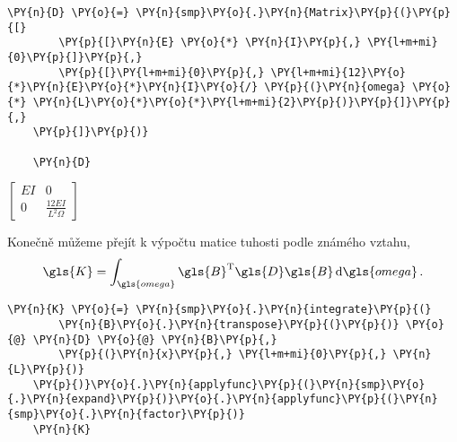 \begin{tcolorbox}[breakable, size=fbox, boxrule=1pt, pad at break*=1mm,colback=cellbackground, colframe=cellborder]
    \begin{Verbatim}[commandchars=\\\{\}]
    \PY{n}{D} \PY{o}{=} \PY{n}{smp}\PY{o}{.}\PY{n}{Matrix}\PY{p}{(}\PY{p}{[}
        \PY{p}{[}\PY{n}{E} \PY{o}{*} \PY{n}{I}\PY{p}{,} \PY{l+m+mi}{0}\PY{p}{]}\PY{p}{,}
        \PY{p}{[}\PY{l+m+mi}{0}\PY{p}{,} \PY{l+m+mi}{12}\PY{o}{*}\PY{n}{E}\PY{o}{*}\PY{n}{I}\PY{o}{/} \PY{p}{(}\PY{n}{omega} \PY{o}{*} \PY{n}{L}\PY{o}{*}\PY{o}{*}\PY{l+m+mi}{2}\PY{p}{)}\PY{p}{]}\PY{p}{,}
    \PY{p}{]}\PY{p}{)}
    
    \PY{n}{D}
    \end{Verbatim}
\end{tcolorbox}
     
                
    
    $\displaystyle \left[\begin{matrix}E I & 0\\0 & \frac{12 E I}{L^{2} \Omega}\end{matrix}\right]$

\vspace{0.3cm}
Konečně můžeme přejít k výpočtu matice tuhosti podle známého vztahu,
\begin{equation*}
    \gls{K} = \int_{\gls{omega}} \gls{B}^{\mathrm{T}}\gls{D}\gls{B} \dd{\gls{omega}}.
\end{equation*}

\begin{tcolorbox}[breakable, size=fbox, boxrule=1pt, pad at break*=1mm,colback=cellbackground, colframe=cellborder]
    \begin{Verbatim}[commandchars=\\\{\}]
    \PY{n}{K} \PY{o}{=} \PY{n}{smp}\PY{o}{.}\PY{n}{integrate}\PY{p}{(}
        \PY{n}{B}\PY{o}{.}\PY{n}{transpose}\PY{p}{(}\PY{p}{)} \PY{o}{@} \PY{n}{D} \PY{o}{@} \PY{n}{B}\PY{p}{,}
        \PY{p}{(}\PY{n}{x}\PY{p}{,} \PY{l+m+mi}{0}\PY{p}{,} \PY{n}{L}\PY{p}{)}
    \PY{p}{)}\PY{o}{.}\PY{n}{applyfunc}\PY{p}{(}\PY{n}{smp}\PY{o}{.}\PY{n}{expand}\PY{p}{)}\PY{o}{.}\PY{n}{applyfunc}\PY{p}{(}\PY{n}{smp}\PY{o}{.}\PY{n}{factor}\PY{p}{)}
    \PY{n}{K}
    \end{Verbatim}
\end{tcolorbox}
     
                
    
